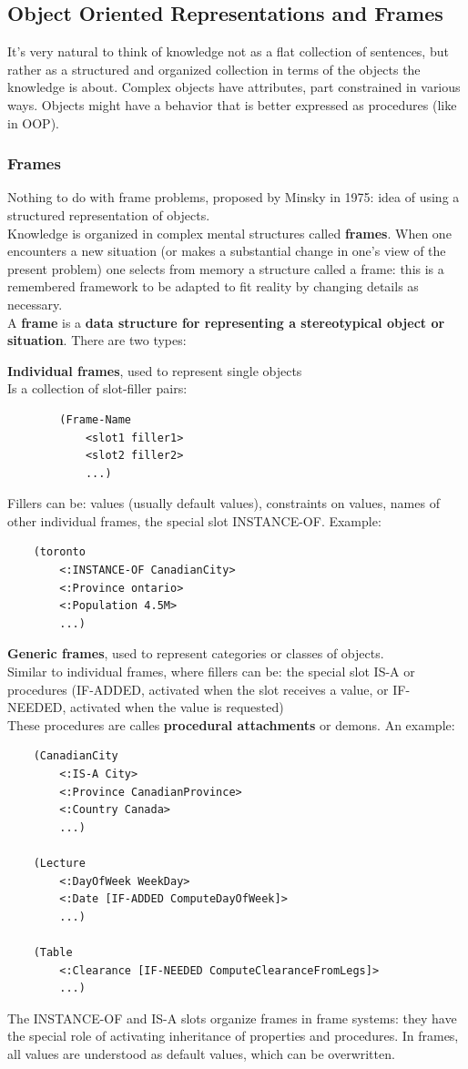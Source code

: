 \documentclass[10pt]{report}
\begin{document}
\subsection{Object Oriented Representations and Frames}
It's very natural to think of knowledge not as a flat collection of sentences, but rather as a structured and organized collection in terms of the objects the knowledge is about. Complex objects have attributes, part constrained in various ways. Objects might have a behavior that is better expressed as procedures (like in OOP).\\
\subsubsection{Frames} Nothing to do with frame problems, proposed by Minsky in 1975: idea of using a structured representation of objects.\\
Knowledge is organized in complex mental structures called \textbf{frames}. When one encounters a new situation (or makes a substantial change in one's view of the present problem) one selects from memory a structure called a frame: this is a remembered framework to be adapted to fit reality by changing details as necessary.\\
A \textbf{frame} is a \textbf{data structure for representing a stereotypical object or situation}. There are two types:
\begin{list}{}{}
	\item \textbf{Individual frames}, used to represent single objects\\
	Is a collection of slot-filler pairs:
	\begin{verbatim}
		(Frame-Name
			<slot1 filler1>
			<slot2 filler2>
			...)
	\end{verbatim}
	Fillers can be: values (usually default values), constraints on values, names of other individual frames, the special slot INSTANCE-OF. Example:
	\begin{verbatim}
	(toronto
		<:INSTANCE-OF CanadianCity>
		<:Province ontario>
		<:Population 4.5M>
		...)
	\end{verbatim}
	\item \textbf{Generic frames}, used to represent categories or classes of objects.\\
	Similar to individual frames, where fillers can be: the special slot IS-A or procedures (IF-ADDED, activated when the slot receives a value, or IF-NEEDED, activated when the value is requested)\\
	These procedures are calles \textbf{procedural attachments} or demons. An example:
	\begin{verbatim}
	(CanadianCity
		<:IS-A City>
		<:Province CanadianProvince>
		<:Country Canada>
		...)
		
	(Lecture
		<:DayOfWeek WeekDay>
		<:Date [IF-ADDED ComputeDayOfWeek]>
		...)
		
	(Table
		<:Clearance [IF-NEEDED ComputeClearanceFromLegs]>
		...)
	\end{verbatim}
\end{list}
The INSTANCE-OF and IS-A slots organize frames in frame systems: they have the special role of activating inheritance of properties and procedures. In frames, all values are understood as default values, which can be overwritten.
\end{document}
